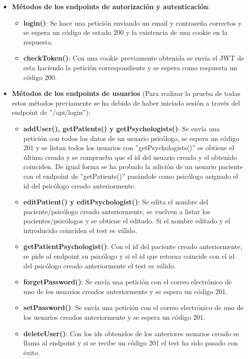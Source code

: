 \begin{itemize}
    \item \textbf{Métodos de los endpoints de autorización y autenticación}:
    \begin{itemize}
        \item \textbf{login()}: Se hace una petición enviando un email y contraseña correctos y se espera un código de estado 200 y la existencia de una cookie en la respuesta.
        \item \textbf{checkToken()}: Con una cookie previamente obtenida se envía el JWT de esta haciendo la petición correspondiente y se espera como respuesta un código 200.
    \end{itemize}
    \item \textbf{Métodos de los endpoints de usuarios} (Para realizar la prueba de todas estos métodos previamente se ha debido de haber iniciado sesión a través del endpoint de ''/api/login''):
    \begin{itemize}
        \item \textbf{addUser(), getPatients() y getPsychologists()}: Se envía una petición con todos los datos de un usuario psicólogo, se espera un código 201 y se listan todos los usuarios con ''getPsychologists()'' se obtiene el último creado y se comprueba que el id del usuario creado y el obtenido coinciden. De igual forma se ha probado la adición de un usuario paciente con el endpoint de ''getPatients()'' pasándole como psicólogo asignado el id del psicólogo creado anteriormente.
        \item \textbf{editPatient() y editPsychologist()}: Se edita el nombre del paciente/psicólogo creado anteriormente, se vuelven a listar los pacientes/psicólogos y se obtiene el editado. Si el nombre editado y el introducido coinciden el test es válido.
        \item \textbf{getPatientPsychologist()}: Con el id del paciente creado anteriormente, se pide al endpoint su psicólogo y si el id que retorna coincide con el id del psicólogo creado anteriormente el test es válido.
        \item \textbf{forgetPassword()}: Se envía una petición con el correo electrónico de uno de los usuarios creados anteriormente y se espera un código 201.
        \item \textbf{setPassword()}: Se envía una petición con el correo electrónico de uno de los usuarios creados anteriormente y se espera un código 201.
        \item \textbf{deleteUser()}: Con los ids obtenidos de los anteriores usuarios creado se llama al endpoint y si se recibe un código 201 el test ha sido pasado con éxito.

\end{itemize}
\end{itemize}
